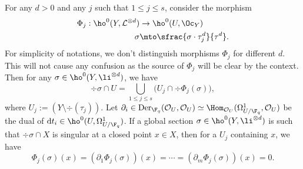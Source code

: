 For any $d>0$ and any $j$ such that $1\leq j\leq s$, consider the morphism
\begin{align*}
\Phi_j: \ho^0(Y,\mathcal{L}^{\otimes d}) & \to \ho^0(U, \Oc_Y) \\
\sigma & \mto \sfrac{\sigma \cdot \tau_j^d}{\tau^d}.
\end{align*}
For simplicity of notations, we don't distinguish morphisms $\Phi_j$ for different $d$. This will not cause any confusion as the source of $\Phi_j$ will be clear by the context. Then for any $\sigma\in \ho^0(Y, \li^{\otimes d})$, we have\vspace*{-3pt}
\[
\div \sigma \cap U=\bigcup_{1\leq j\leq s}\bigl(U_j\cap \div \Phi_j(\sigma)\bigr),
\]
where $U_j:=\left(Y\setminus\div (\tau_j)\right)$. Let $\partial_i\in \mathrm{Der}_{\F_q}(\mathcal{O}_U, \mathcal{O}_U)\simeq \Hom_{\mathcal{O}_U}(\Omega^1_{U/\F_q}, \mathcal{O}_U)$ be the dual of $\mathrm{d}t_i\in \ho^0(U, \Omega^1_{U/\F_q})$. If a global section $\sigma\in \ho^0(Y, \li^{\otimes d})$ is such that $\div \sigma\cap X$ is singular at a closed point $x\in X$, then for a $U_j$ containing $x$, we have\vspace*{-3pt}
\[
\Phi_j(\sigma)(x)=\left(\partial_1 \Phi_j(\sigma)\right)(x)=\cdots =\left(\partial_m \Phi_j(\sigma) \right)(x)=0.
\]


